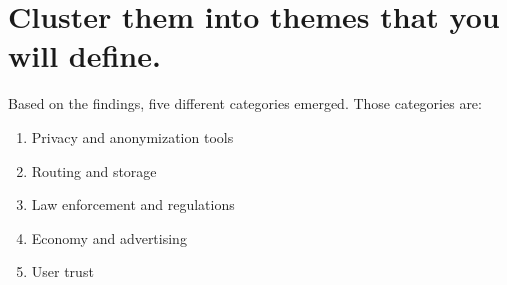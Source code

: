 \section{Cluster them into themes that you will define.}
\label{section_2}
Based on the findings, five different categories emerged. Those categories are:
\begin{enumerate}
\item
Privacy and anonymization tools
\item
Routing and storage
\item
Law enforcement and regulations
\item
Economy and advertising
\item
User trust
\end{enumerate}
